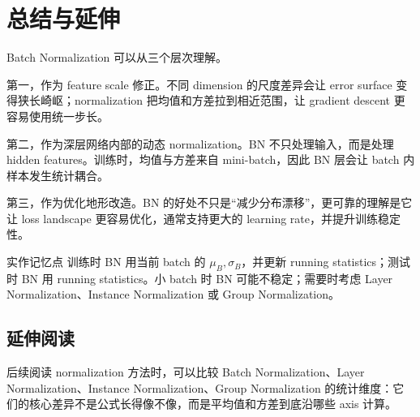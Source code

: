 \documentclass[a4paper]{article}
\begin{document}
\section{总结与延伸}

Batch Normalization 可以从三个层次理解。

第一，作为 feature scale 修正。不同 dimension 的尺度差异会让 error surface 变得狭长崎岖；normalization 把均值和方差拉到相近范围，让 gradient descent 更容易使用统一步长。

第二，作为深层网络内部的动态 normalization。BN 不只处理输入，而是处理 hidden features。训练时，均值与方差来自 mini-batch，因此 BN 层会让 batch 内样本发生统计耦合。

第三，作为优化地形改造。BN 的好处不只是“减少分布漂移”，更可靠的理解是它让 loss landscape 更容易优化，通常支持更大的 learning rate，并提升训练稳定性。

\begin{importantbox}{实作记忆点}
    训练时 BN 用当前 batch 的 $\mu_B,\sigma_B$，并更新 running statistics；测试时 BN 用 running statistics。小 batch 时 BN 可能不稳定；需要时考虑 Layer Normalization、Instance Normalization 或 Group Normalization。
\end{importantbox}

\subsection{延伸阅读}

后续阅读 normalization 方法时，可以比较 Batch Normalization、Layer Normalization、Instance Normalization、Group Normalization 的统计维度：它们的核心差异不是公式长得像不像，而是平均值和方差到底沿哪些 axis 计算。
\end{document}
